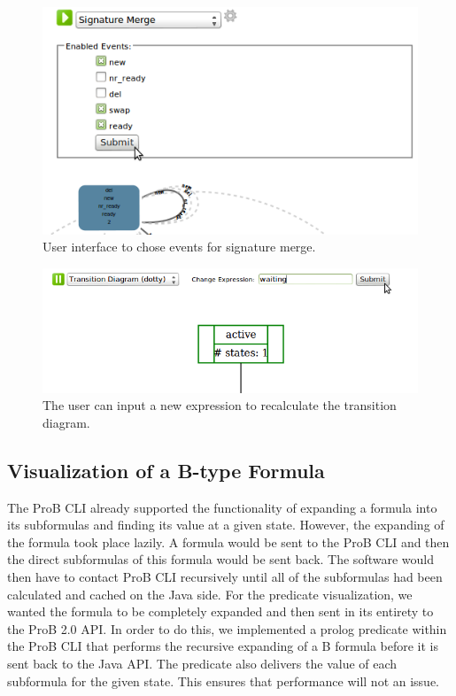 \begin{figure}[h!]
\centering
\includegraphics[width=15cm]{bilder/sigMergeUI.png}
\caption{User interface to chose events for signature merge.}
\label{sigMergeUI}
\end{figure}

\begin{figure}[h!]
\centering
\includegraphics[width=15cm]{bilder/transDiag-UI.png}
\caption{The user can input a new expression to recalculate the transition diagram.}
\label{transDiagUI}
\end{figure}


\subsection{Visualization of a B-type Formula}

The ProB CLI already supported the functionality of expanding a formula into its subformulas and finding its value at a given state. However, the expanding of the formula took place lazily. A formula would be sent to the ProB CLI and then the direct subformulas of this formula would be sent back. The software would then have to contact ProB CLI recursively until all of the subformulas had been calculated and cached on the Java side. For the predicate visualization, we wanted the formula to be completely expanded and then sent in its entirety to the ProB 2.0 API. In order to do this, we implemented a prolog predicate within the ProB CLI that performs the recursive expanding of a B formula before it is sent back to the Java API. The predicate also delivers the value of each subformula for the given state. This ensures that performance will not an issue. 

